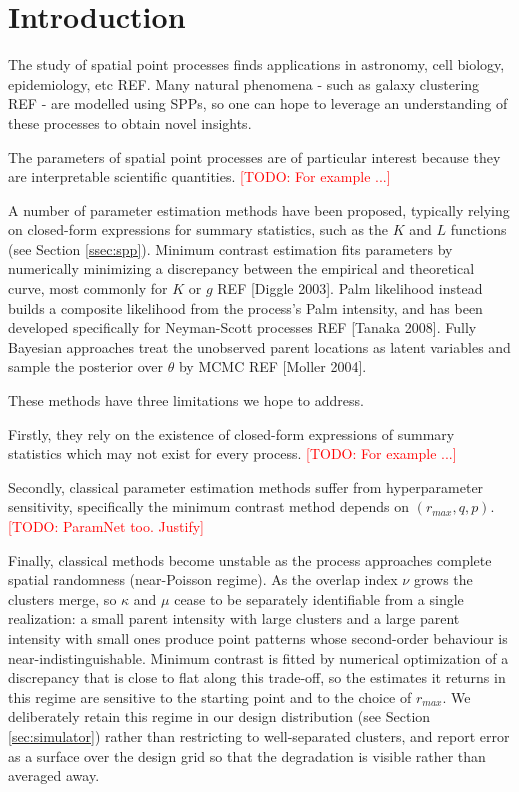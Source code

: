 \documentclass[11pt,letterpaper]{article}
\newcommand{\1}{\mathds{1}}
\newcommand{\todo}[1]{\textcolor{red}{[TODO: #1]}}
\newcommand{\fix}[1]{\textcolor{blue}{[FIX: #1]}}
\newcommand{\todo}[1]{}\newcommand{\fix}[1]{}
\theoremstyle{plain}
\theoremstyle{definitioncolon}
\begin{document}
\section{Introduction}
\label{sec:intro}

The study of spatial point processes finds applications in astronomy, cell
biology, epidemiology, etc REF. Many natural phenomena - such as galaxy clustering REF -
are modelled using SPPs, so one can hope to leverage an understanding of these
processes to obtain novel insights.

The parameters of spatial point processes are of particular interest because 
they are interpretable scientific quantities. \todo{For example ...}

A number of parameter estimation methods have been proposed, typically relying
on closed-form expressions for summary statistics, such as the $K$ and $L$
functions (see Section \ref{ssec:spp}). Minimum contrast estimation fits parameters by numerically
minimizing a discrepancy between the empirical and theoretical curve, most
commonly for $K$ or $g$ REF [Diggle 2003]. Palm likelihood instead
builds a composite likelihood from the process's Palm intensity, and has been
developed specifically for Neyman-Scott processes REF [Tanaka 2008].
Fully Bayesian approaches treat the unobserved parent locations as latent
variables and sample the posterior over $\theta$ by MCMC REF
[Moller 2004].

These methods have three limitations we hope to address.

Firstly, they rely on the existence of closed-form expressions of
summary statistics which may not exist for every process. \todo{For example ...}

Secondly, classical parameter estimation methods suffer from 
hyperparameter sensitivity, specifically the minimum contrast method
depends on $(r_{max}, q, p)$. \todo{ParamNet too. Justify}

Finally, classical methods become unstable as the process approaches complete
spatial randomness (near-Poisson regime). As the overlap index $\nu$ grows the clusters merge, so
$\kappa$ and $\mu$ cease to be separately identifiable from a single
realization: a small parent intensity with large clusters and a large parent
intensity with small ones produce point patterns whose second-order behaviour is
near-indistinguishable. Minimum contrast is fitted by numerical optimization of
a discrepancy that is close to flat along this trade-off, so the estimates it
returns in this regime are sensitive to the starting point and to the choice of
$r_{max}$. We deliberately retain this regime in our design distribution (see
Section \ref{sec:simulator}) rather than restricting to well-separated clusters,
and report error as a surface over the design grid so that the degradation is
visible rather than averaged away.
\end{document}

